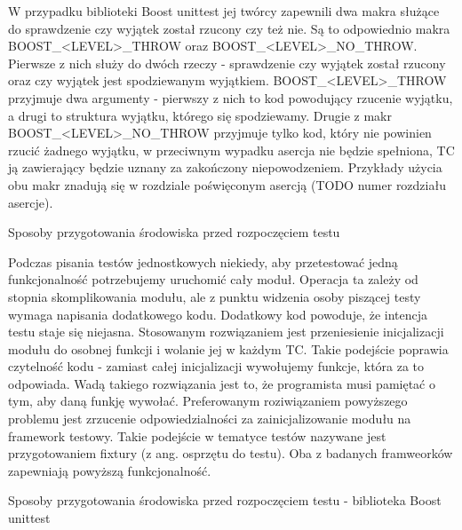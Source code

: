 W przypadku biblioteki Boost unittest jej twórcy zapewnili dwa makra służące do sprawdzenie czy wyjątek został rzucony czy też nie. Są to odpowiednio makra BOOST_<LEVEL>_THROW oraz BOOST_<LEVEL>_NO_THROW. Pierwsze z nich służy do dwóch rzeczy - sprawdzenie czy wyjątek został rzucony oraz czy wyjątek jest spodziewanym wyjątkiem. BOOST_<LEVEL>_THROW przyjmuje dwa argumenty - pierwszy z nich to kod powodujący rzucenie wyjątku, a drugi to struktura wyjątku, którego się spodziewamy. 
Drugie z makr BOOST_<LEVEL>_NO_THROW przyjmuje tylko kod, który nie powinien rzucić żadnego wyjątku, w przeciwnym wypadku asercja nie będzie spełniona, TC ją zawierający będzie uznany za zakończony niepowodzeniem.
Przykłady użycia obu makr znadują się w rozdziale poświęconym asercją (TODO numer rozdziału asercje).

Sposoby przygotowania środowiska przed rozpoczęciem testu

Podczas pisania testów jednostkowych niekiedy, aby przetestować jedną funkcjonalność potrzebujemy uruchomić cały moduł. Operacja ta zależy od stopnia skomplikowania modułu, ale z punktu widzenia osoby piszącej testy wymaga napisania dodatkowego kodu. Dodatkowy kod powoduje, że intencja testu staje się niejasna. 
Stosowanym rozwiązaniem jest przeniesienie inicjalizacji modułu do osobnej funkcji i wolanie jej w każdym TC. Takie podejście poprawia czytelność kodu - zamiast całej inicjalizacji wywołujemy funkcje, która za to odpowiada. Wadą takiego rozwiązania jest to, że programista musi pamiętać o tym, aby daną funkję wywołać.
Preferowanym roziwiązaniem powyższego problemu jest zrzucenie odpowiedzialności za zainicjalizowanie modułu na framework testowy. Takie podejście w tematyce testów nazywane jest przygotowaniem fixtury (z ang. osprzętu do testu).
Oba z badanych framweorków zapewniają powyższą funkcjonalność.

Sposoby przygotowania środowiska przed rozpoczęciem testu - biblioteka Boost unittest

